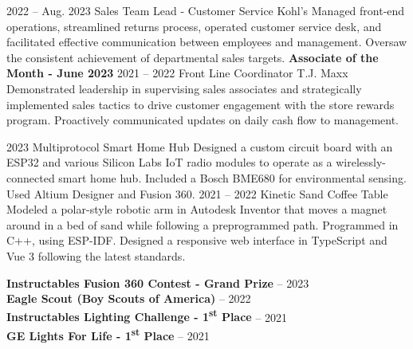 \documentclass[9pt]{developercv} %
\begin{document}


\begin{entrylist}
	\entry
		{2022 -- Aug. 2023}
		{Sales Team Lead - Customer Service}
		{Kohl's}
		{Managed front-end operations, streamlined returns process, operated customer service desk, and facilitated effective communication between employees and management. Oversaw the consistent achievement of departmental sales targets.  \textbf{Associate of the Month - June 2023} }
		\entry
		{2021 -- 2022}
		{Front Line Coordinator}
		{T.J. Maxx}
		{Demonstrated leadership in supervising sales associates and strategically implemented sales tactics to drive customer engagement with the store rewards program. Proactively communicated updates on daily cash flow to management.}
\end{entrylist}



\begin{entrylist}
	\entry
		{2023}
		{Multiprotocol Smart Home Hub}
		{}
		{Designed a custom circuit board with an ESP32 and various Silicon Labs IoT radio modules to operate as a wirelessly-connected smart home hub. Included a Bosch BME680 for environmental sensing. Used Altium Designer and Fusion 360.}
		\entry
		{2021 -- 2022}
		{Kinetic Sand Coffee Table}
		{}
		{Modeled a polar-style robotic arm in Autodesk Inventor that moves a magnet around in a bed of sand while following a preprogrammed path. Programmed in C++, using ESP-IDF. Designed a responsive web interface in TypeScript and Vue 3 following the latest standards.}
\end{entrylist}

\vspace{0.3cm}


\begin{minipage}[t]{1\textwidth}
	\vspace{-\baselineskip} %
	
	
	\textbf{Instructables Fusion 360 Contest - Grand Prize} -- 2023\\
	\textbf{Eagle Scout (Boy Scouts of America)} -- 2022\\
	\textbf{Instructables Lighting Challenge - 1\textsuperscript{st} Place} -- 2021\\
	\textbf{GE Lights For Life - 1\textsuperscript{st} Place} -- 2021\\
\end{minipage}

\vspace{\baselineskip}

\end{document}
